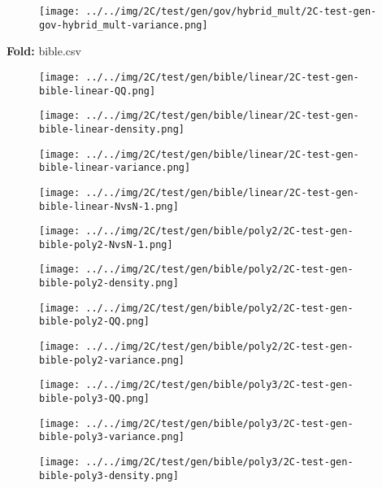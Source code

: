 \begin{figure}[H]
\centering	\texttt{[image: ../../img/2C/test/gen/gov/hybrid\_mult/2C-test-gen-gov-hybrid\_mult-variance.png]}
\end{figure}
\textbf{Fold:} bible.csv
\begin{figure}[H]
\centering	\texttt{[image: ../../img/2C/test/gen/bible/linear/2C-test-gen-bible-linear-QQ.png]}
\end{figure}
\begin{figure}[H]
\centering	\texttt{[image: ../../img/2C/test/gen/bible/linear/2C-test-gen-bible-linear-density.png]}
\end{figure}
\begin{figure}[H]
\centering	\texttt{[image: ../../img/2C/test/gen/bible/linear/2C-test-gen-bible-linear-variance.png]}
\end{figure}
\begin{figure}[H]
\centering	\texttt{[image: ../../img/2C/test/gen/bible/linear/2C-test-gen-bible-linear-NvsN-1.png]}
\end{figure}
\begin{figure}[H]
\centering	\texttt{[image: ../../img/2C/test/gen/bible/poly2/2C-test-gen-bible-poly2-NvsN-1.png]}
\end{figure}
\begin{figure}[H]
\centering	\texttt{[image: ../../img/2C/test/gen/bible/poly2/2C-test-gen-bible-poly2-density.png]}
\end{figure}
\begin{figure}[H]
\centering	\texttt{[image: ../../img/2C/test/gen/bible/poly2/2C-test-gen-bible-poly2-QQ.png]}
\end{figure}
\begin{figure}[H]
\centering	\texttt{[image: ../../img/2C/test/gen/bible/poly2/2C-test-gen-bible-poly2-variance.png]}
\end{figure}
\begin{figure}[H]
\centering	\texttt{[image: ../../img/2C/test/gen/bible/poly3/2C-test-gen-bible-poly3-QQ.png]}
\end{figure}
\begin{figure}[H]
\centering	\texttt{[image: ../../img/2C/test/gen/bible/poly3/2C-test-gen-bible-poly3-variance.png]}
\end{figure}
\begin{figure}[H]
\centering	\texttt{[image: ../../img/2C/test/gen/bible/poly3/2C-test-gen-bible-poly3-density.png]}
\end{figure}
